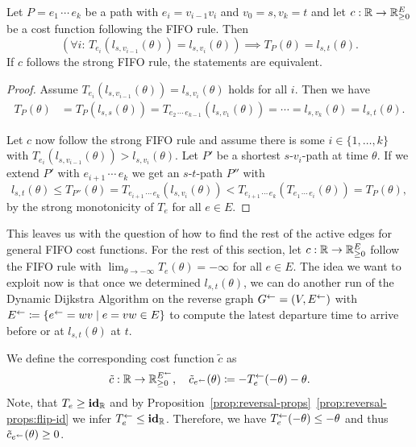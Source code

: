 \begin{proposition}
    Let $P=e_1\,\cdots\,e_k$ be a path with $e_i = v_{i-1}v_{i}$ and $v_0 = s, v_k= t$ and let $c:\mathbb{R}\rightarrow\mathbb{R}^E_{\geq0}$ be a cost function following the FIFO rule. Then
    \[ 
        \left(\forall i:\, T_{e_i}(l_{s,v_{i-1}}(\theta)) = l_{s,v_i}(\theta)\right)
        \implies
        T_P(\theta) = l_{s,t}(\theta).
    \]
    If $c$ follows the strong FIFO rule, the statements are equivalent.
\end{proposition}
\begin{proof}
    Assume $T_{e_i}(l_{s,v_{i-1}}(\theta)) = l_{s,v_i}(\theta)$ holds for all $i$.
    Then we have \begin{align*}
        T_P(\theta)
        &= T_P(l_{s,s}(\theta))
        = T_{e_2\,\cdots\,e_{k-1}}(l_{s,v_1}(\theta))
        = \cdots
        = l_{s,v_k}(\theta) = l_{s,t}(\theta).
    \end{align*}

    Let $c$ now follow the strong FIFO rule and assume there is some $i\in\{1,\dots, k\}$ with $T_{e_i}(l_{s,v_{i-1}}(\theta)) > l_{s,v_i}(\theta)$.
    Let $P'$ be a shortest $s$-$v_i$-path at time $\theta$.
    If we extend $P'$ with $e_{i+1}\,\cdots\,e_{k}$ we get an $s$-$t$-path $P''$ with \[
        l_{s,t}(\theta) \leq T_{P''}(\theta)
        = T_{e_{i+1}\,\cdots\,e_k}(l_{s,v_{i}}(\theta))
        < T_{e_{i+1}\,\cdots\,e_k}(T_{e_1\,\cdots\,e_i}(\theta))
        = T_P(\theta),
    \]
    by the strong monotonicity of $T_e$ for all $e\in E$.
\end{proof}

This leaves us with the question of how to find the rest of the active edges for general FIFO cost functions.
For the rest of this section, let $c:\mathbb{R}\rightarrow\mathbb{R}^E_{\geq0}$ follow the FIFO rule with $\lim_{\theta\to-\infty} T_e(\theta) = -\infty$ for all $e\in E$.
The idea we want to exploit now is that once we determined $l_{s,t}(\theta)$, we can do another run of the Dynamic Dijkstra Algorithm on the reverse graph $G^{\leftarrow} = (V, E^{\leftarrow})$ with $E^{\leftarrow}\coloneqq \{ e^{\leftarrow} = wv \mid e=vw\in E \}$ to compute the latest departure time to arrive before or at $l_{s,t}(\theta)$ at $t$.

We define the corresponding cost function $\tilde c$ as \[
    \tilde c : \mathbb{R} \rightarrow \mathbb{R}_{\geq0}^{E^{\leftarrow}}, \quad
    \tilde c_{e^{\leftarrow}}(\theta) \coloneqq - T_e^{\leftarrow}(-\theta) - \theta.
\]
Note, that $T_e  \geq \mathbf{id}_{\mathbb{R}}$ and by Proposition~\ref{prop:reversal-props}~\ref{prop:reversal-props:flip-id} we infer $T_e^{\leftarrow} \leq \mathbf{id}_{\mathbb{R}}$.
Therefore, we have $T_e^{\leftarrow}(-\theta) \leq -\theta$ and thus $\tilde c_{e^{\leftarrow}}(\theta) \geq 0$.

